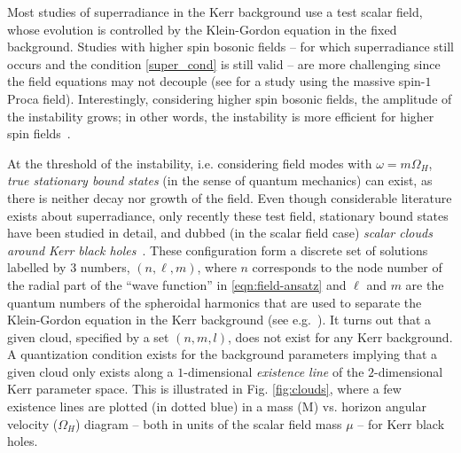 Most studies of superradiance in the Kerr background use a test scalar field, whose evolution is controlled by the Klein-Gordon equation in the fixed background.
Studies with higher spin bosonic fields -- for which superradiance still occurs and the condition \eqref{super_cond} is still valid -- are more challenging since the field equations may not decouple (see \cite{Pani:2012bp} for a study using the massive spin-$1$ Proca field).
Interestingly, considering higher spin bosonic fields, the amplitude of the instability grows; in other words, the instability is more efficient for higher spin fields~\cite{Teukolsky:1974yv}. 

At the threshold of the instability, i.e. considering field modes with $\omega=m\Omega_H$, \textit{true stationary bound states} (in the sense of quantum mechanics) can exist, as there is neither decay nor growth of the field.
Even though considerable literature exists about superradiance, only recently these test field, stationary bound states have been studied in detail, and dubbed (in the scalar field case) \textit{scalar clouds around Kerr black holes}~\cite{Hod:2012px,Hod:2013zza,Herdeiro:2014goa}.
These configuration form a discrete set of solutions labelled by $3$ numbers, $(n,\ell,m)$, where $n$ corresponds to the node number of the radial part of the ``wave function'' in \eqref{eqn:field-ansatz} and $\ell$ and $m$ are the quantum numbers of the spheroidal harmonics that are used to separate the Klein-Gordon equation in the Kerr background (see e.g.~\cite{Brill:1972xj}).
It turns out that a given cloud, specified by a set $(n,m,l)$, does not exist for any Kerr background.
A quantization condition exists for the background parameters implying that a given cloud only exists along a $1$-dimensional \textit{existence line} of the $2$-dimensional Kerr parameter space.
This is illustrated in Fig. \ref{fig:clouds}, where a few existence lines are plotted (in dotted blue) in a mass (M) vs. horizon angular velocity ($\Omega_H$) diagram -- both in units of the scalar field mass $\mu$ -- for Kerr black holes. 
%
